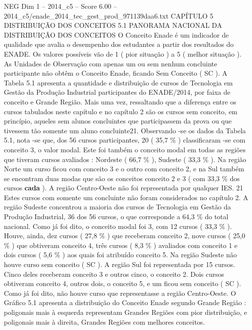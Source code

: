 \begin{textsample}{NEG Dim 1 – 2014\_c5 – Score 6.00 – 2014\_c5/enade\_2014\_tec\_gest\_prod\_971139daa6.txt}  \label{ex:f1_neg_334}
CAPÍTULO 5 DISTRIBUIÇÃO DOS CONCEITOS 5.1 PANORAMA NACIONAL DA DISTRIBUIÇÃO DOS CONCEITOS O Conceito Enade é um indicador de qualidade que avalia o desempenho dos estudantes a partir dos resultados do ENADE.
Os valores possíveis vão de 1 ( pior situação ) a 5 ( melhor situação ).
As Unidades de Observação com apenas um ou sem nenhum concluinte participante não obtêm o Conceito Enade, ficando Sem Conceito ( SC ).
A Tabela 5.1 apresenta a quantidade e distribuição de cursos de Tecnologia em Gestão da Produção Industrial participantes do ENADE/2014, por faixa de conceito e Grande Região.
Mais uma vez, ressaltando que a diferença entre os cursos tabulados neste capítulo e no capítulo 2 são os cursos sem conceito, em princípio, aqueles sem alunos concluintes que participassem da prova ou que tivessem tão somente um aluno concluinte21.
Observando -se os dados da Tabela 5.1, nota -se que, dos 56 cursos participantes, 20 ( 35,7 \% ) classificaram -se com conceito 3, o valor modal.
Este foi também o conceito modal em todas as regiões que tiveram cursos avaliados : Nordeste ( 66,7 \% ), Sudeste ( 33,3 \% ).
Na região Norte um curso ficou com conceito 3 e o outro com conceito 2, e na Sul também se encontram duas modas que são os conceitos conceito 2 e 3 ( com 33,3 \% dos cursos \textbf{cada} ).
A região Centro-Oeste não foi representada por qualquer IES. 21 Estes cursos com somente um concluinte não foram considerados no capítulo 2.
A região Sudeste concentrou a maioria dos cursos de Tecnologia em Gestão da Produção Industrial, 36 dos 56 cursos, o que corresponde a 64,3 \% do total nacional.
Como já foi dito, o conceito modal foi 3, com 12 cursos ( 33,3 \% ).
Houve, ainda, dez cursos ( 27,8 \% ) que receberam conceito 2, nove cursos ( 25,0 \% ) que obtiveram conceito 4, três cursos ( 8,3 \% ) avaliados com conceito 1 e dois cursos ( 5,6 \% ) aos quais foi atribuído conceito 5.
Na região Sudeste não houve curso sem conceito ( SC ).
A região Sul foi representada por 15 cursos.
Cinco deles receberam conceito 3 e outros cinco, o conceito 2.
Dois cursos obtiveram conceito 4, outros dois, o conceito 5, e um ficou sem conceito ( SC ).
Como já foi dito, não houve curso que representasse a região Centro-Oeste.
O Gráfico 5.1 apresenta a distribuição do Conceito Enade segundo Grande Região : poligonais mais à esquerda representam Grandes Regiões com pior distribuição, e poligonais mais à direita, Grandes Regiões com melhores conceitos.

\end{textsample}

